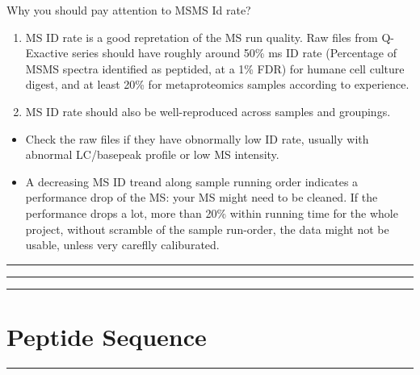 \documentclass[
]{article}
\providecommand{\tightlist}{%
  \setlength{\itemsep}{0pt}\setlength{\parskip}{0pt}}
\begin{document}
Why you should pay attention to MSMS Id rate?

\begin{enumerate}
\def\labelenumi{\arabic{enumi}.}
\item
  MS ID rate is a good repretation of the MS run quality. Raw files from
  Q-Exactive series should have roughly around 50\% ms ID rate
  (Percentage of MSMS spectra identified as peptided, at a 1\% FDR) for
  humane cell culture digest, and at least 20\% for metaproteomics
  samples according to experience.
\item
  MS ID rate should also be well-reproduced across samples and
  groupings.
\end{enumerate}

\begin{itemize}
\tightlist
\item
  Check the raw files if they have obnormally low ID rate, usually with
  abnormal LC/basepeak profile or low MS intensity.
\item
  A decreasing MS ID treand along sample running order indicates a
  performance drop of the MS: your MS might need to be cleaned. If the
  performance drops a lot, more than 20\% within running time for the
  whole project, without scramble of the sample run-order, the data
  might not be usable, unless very careflly caliburated.
\end{itemize}

\begin{center}\rule{0.5\linewidth}{0.5pt}\end{center}

\hypertarget{htmlwidget-ad316157be37b4a670ca}{}

\begin{center}\rule{0.5\linewidth}{0.5pt}\end{center}

\hypertarget{htmlwidget-6e37fb6c4f29746392e2}{}

\begin{center}\rule{0.5\linewidth}{0.5pt}\end{center}

\hypertarget{htmlwidget-795767f34d5ddfe65de6}{}

\hypertarget{peptide-sequence}{%
\section{Peptide Sequence}\label{peptide-sequence}}

\begin{center}\rule{0.5\linewidth}{0.5pt}\end{center}
\end{document}
